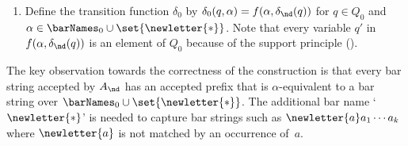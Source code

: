 \documentclass[10pt, final, conference, a4paper, twocolumn]{IEEEtran}
\renewcommand{\enquote}[1]{`#1'}
\begin{document}
\begin{construction}
\begin{enumerate}
\[{\begin{cases}
        \bot & \text{if $\alpha = \newletter{\ast}$, $\Diamond_\beta q = \Diamond_\alpha q'$ for some $q'$} \\
             & \text{with $\ast \in \supp(q')$,}\\
        \top & \text{if $\Diamond_\beta q = \Diamond_\alpha q'$ for some $q'$} \\
             & \text{and $\delta_{\nd}(q') \equiv \top$,} \\
          q' & \text{if $\Diamond_\beta q = \Diamond_\alpha q'$ for some $q'$}\\
             & \text{and $\delta_{\nd}(q') \not\equiv \top$;}
           \end{cases}
           }%
      \]
      and $f(\alpha, \varphi \ast \psi) = f(\alpha, \varphi) \ast f(\alpha, \psi)$
      for $\ast \in \set{\vee,\wedge}$.
    \item Define the transition function $\delta_0$  by  $\delta_0(q, \alpha) =
      f(\alpha, \delta_{\nd}(q))$ for $q \in Q_0$ and $\alpha \in \barNames_0 \cup \set{\newletter{\ast}}$. Note that
      every variable $q'$ in $f(\alpha, \delta_{\nd}(q))$ is an element of $Q_0$ because of the support principle
      ().
  \end{enumerate}%
\end{construction}

\noindent The key observation towards the correctness of the construction is that every bar string accepted by $A_{\nd}$ has an accepted prefix that is $\alpha$-equivalent to a bar string over $\barNames_0 \cup \set{\newletter{\ast}}$. The additional bar name \enquote{$\newletter{\ast}$} is needed to capture bar strings such as $\newletter{a}a_1 \cdots a_k$ where $\newletter{a}$ is not matched by an occurrence of~$a$.
\end{document}

